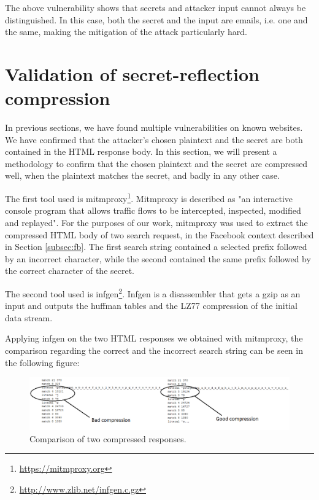 The above vulnerability shows that secrets and attacker input cannot always be
distinguished. In this case, both the secret and the input are emails, i.e. one
and the same, making the mitigation of the attack particularly hard.

\section{Validation of secret-reflection compression}\label{sec:mitmproxy}

In previous sections, we have found multiple vulnerabilities on known websites.
We have confirmed that the attacker's chosen plaintext and the secret are both
contained in the HTML response body. In this section, we will present a
methodology to confirm that the chosen plaintext and the secret are compressed
well, when the plaintext matches the secret, and badly in any other case.

The first tool used is mitmproxy\footnote{\url{https://mitmproxy.org}}.
Mitmproxy is described as "an interactive console program that allows traffic
flows to be intercepted, inspected, modified and replayed". For the purposes of
our work, mitmproxy was used to extract the compressed HTML body of two search
request, in the Facebook context described in Section \ref{subsec:fb}. The first
search string contained a selected prefix followed by an incorrect character,
while the second contained the same prefix followed by the correct character of
    the secret.

The second tool used is infgen\footnote{\url{http://www.zlib.net/infgen.c.gz}}.
Infgen is a disassembler that gets a gzip as an input and outputs the huffman
tables and the LZ77 compression of the initial data stream.

Applying infgen on the two HTML responses we obtained with mitmproxy, the
comparison regarding the correct and the incorrect search string can be seen in
the following figure:

\begin{figure}[H] \caption{Comparison of two compressed responses.}
\includegraphics[width=1.15\textwidth]{diagrams/compression_comparison.png}\end{figure}

